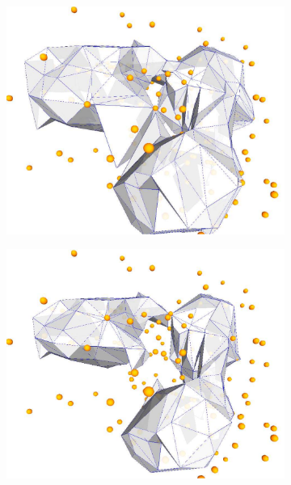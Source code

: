 \begin{figure}
  \centering
  \begin{subfigure}[b]{0.3\linewidth}
    \centering
    \includegraphics[width=\textwidth]{figs/isosurface2}
    \caption{}
  \end{subfigure}%
  \qquad
  \begin{subfigure}[b]{0.3\linewidth}
    \centering
    \includegraphics[width=\textwidth]{figs/isosurface25}
    \caption{}
  \end{subfigure}
  \qquad
  \begin{subfigure}[b]{0.3\linewidth}

\end{subfigure}
\end{figure}
